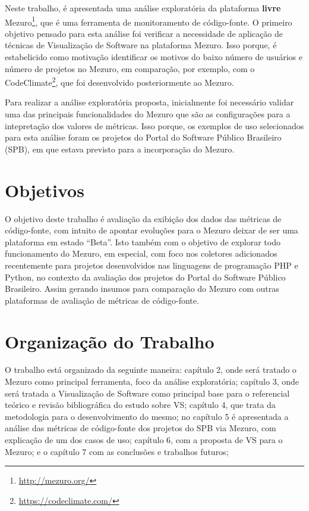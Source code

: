 Neste trabalho, é apresentada uma análise exploratória da plataforma \textbf{livre}
Mezuro\footnote{\url{http://mezuro.org/}}, que é uma ferramenta de monitoramento
de código-fonte. O primeiro objetivo pensado para esta análise foi verificar a
necessidade de aplicação de técnicas de Visualização de Software na plataforma
Mezuro. Isso porque, é estabelicido como motivação identificar os motivos do
baixo número de usuários e número de projetos no Mezuro, em comparação, por
exemplo, com o CodeClimate\footnote{\url{https://codeclimate.com/}}, que foi
desenvolvido posteriormente ao Mezuro.

Para realizar a análise exploratória proposta, inicialmente foi necessário
validar uma das principais funcionalidades do Mezuro que são as configurações
para a intepretação dos valores de métricas. Isso porque, os exemplos de uso
selecionados para esta análise foram os projetos do Portal do Software
Público Brasileiro (SPB), em que estava previsto para a incorporação do Mezuro.

\section{Objetivos}

O objetivo deste trabalho é avaliação da exibição dos dados das métricas de
código-fonte, com intuito de apontar evoluções para o Mezuro deixar de ser uma
plataforma em estado ``Beta''.
%
Isto também com o objetivo de explorar todo funcionamento do Mezuro, em especial,
com foco nos coletores adicionados recentemente para projetos desenvolvidos nas
linguagens de programação PHP e Python, no contexto da avaliação dos projetos do
Portal do Software Público Brasileiro.
%
Assim gerando insumos para comparação do Mezuro com outras plataformas de
avaliação de métricas de código-fonte.

\section{Organização do Trabalho}


O trabalho está organizado da seguinte maneira: capítulo 2, onde será tratado o
Mezuro como principal ferramenta, foco da análise exploratória; capítulo 3, onde
será tratada a Visualização de Software como principal base para o
referencial teórico e revisão bibliográfica do estudo sobre VS; capítulo 4,
que trata da metodologia para o desenvolvimento do mesmo; no capítulo 5 é
apresentada a análise das métricas de código-fonte dos projetos do SPB via
Mezuro, com explicação de um dos casos de uso; capítulo 6, com a proposta de VS
para o Mezuro; e o capítulo 7 com as conclusões e trabalhos futuros;
